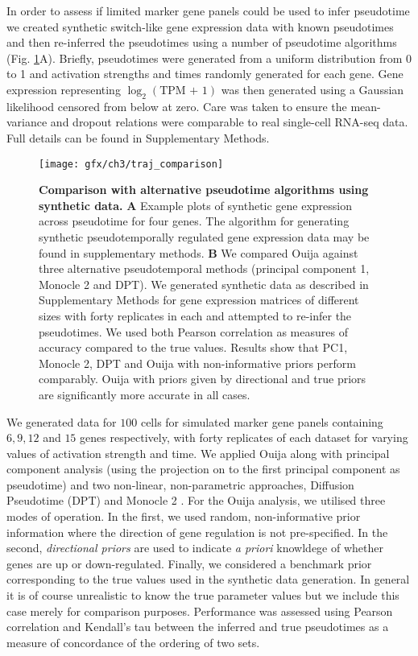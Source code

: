 In order to assess if limited marker gene panels could be used to infer pseudotime we created synthetic switch-like gene expression data with known pseudotimes and then re-inferred the pseudotimes using a number of  pseudotime algorithms (Fig. \ref{fig:benchmarking}A). Briefly, pseudotimes were generated from a uniform distribution from 0 to 1 and activation strengths and times randomly generated for each gene. Gene expression representing $\log_2(\text{TPM + 1})$ was then generated using a Gaussian likelihood censored from below at zero. Care was taken to ensure the mean-variance and dropout relations were comparable to real single-cell RNA-seq data. Full details can be found in Supplementary Methods.

\begin{figure}[!t]
	\centering
	\texttt{[image: gfx/ch3/traj\_comparison]}
	\caption{{\bf Comparison with alternative pseudotime algorithms using synthetic data.}
	\textbf{A} Example plots of synthetic gene expression across pseudotime for four genes. The algorithm for generating synthetic pseudotemporally regulated gene expression data may be found in supplementary methods.
	\textbf{B} We compared Ouija against three alternative pseudotemporal methods (principal component 1, Monocle 2 and DPT). We generated synthetic data as described in Supplementary Methods for gene expression matrices of different sizes with forty replicates in each and attempted to re-infer the pseudotimes. We used both Pearson correlation as measures of accuracy compared to the true values. Results show that PC1, Monocle 2, DPT and Ouija with non-informative priors perform comparably. Ouija with priors given by directional and true priors are significantly more accurate in all cases.}
	\label{fig:benchmarking}
\end{figure}

We generated data for $100$ cells for simulated marker gene panels containing $6, 9, 12$ and $15$ genes respectively, with forty replicates of each dataset for varying values of activation strength and time. We applied Ouija along with principal component analysis (using the projection on to the first principal component as pseudotime) and two non-linear, non-parametric approaches, Diffusion Pseudotime (DPT) \cite{haghverdi2016diffusion} and Monocle 2 \cite{Trapnell2014}. For the Ouija analysis, we utilised three modes of operation. In the first, we used random, non-informative prior information where the direction of gene regulation is not pre-specified. In the second, \emph{directional priors} are used to indicate \emph{a priori} knowldege of whether genes are up or down-regulated. Finally, we considered a benchmark prior corresponding to the true values used in the synthetic data generation. In general it is of course unrealistic to know the true parameter values but we include this case merely for comparison purposes. Performance was assessed using Pearson correlation and Kendall's tau between the inferred and true pseudotimes as a measure of concordance of the ordering of two sets.

